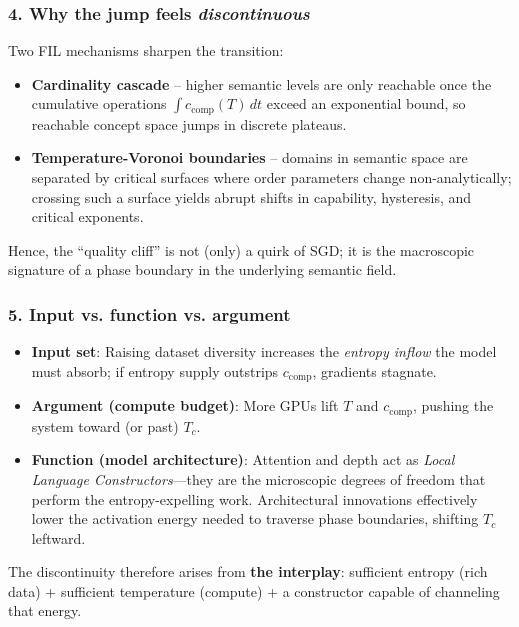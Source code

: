 \documentclass[11pt,letterpaper]{article}
\begin{document}
\subsubsection*{4. Why the jump feels \emph{discontinuous}}
Two FIL mechanisms sharpen the transition:
\begin{itemize}
    \item \textbf{Cardinality cascade} – higher semantic levels are only reachable once the cumulative operations $\int c_{\text{comp}}(T)\,dt$ exceed an exponential bound, so reachable concept space jumps in discrete plateaus.
    \item \textbf{Temperature-Voronoi boundaries} – domains in semantic space are separated by critical surfaces where order parameters change non-analytically; crossing such a surface yields abrupt shifts in capability, hysteresis, and critical exponents.
\end{itemize}
Hence, the “quality cliff” is not (only) a quirk of SGD; it is the macroscopic signature of a phase boundary in the underlying semantic field.

\subsubsection*{5. Input vs. function vs. argument}
\begin{itemize}
    \item \textbf{Input set}: Raising dataset diversity increases the \emph{entropy inflow} the model must absorb; if entropy supply outstrips $c_{\text{comp}}$, gradients stagnate.
    \item \textbf{Argument (compute budget)}: More GPUs lift $T$ and $c_{\text{comp}}$, pushing the system toward (or past) $T_{c}$.
    \item \textbf{Function (model architecture)}: Attention and depth act as \emph{Local Language Constructors}—they are the microscopic degrees of freedom that perform the entropy-expelling work. Architectural innovations effectively lower the activation energy needed to traverse phase boundaries, shifting $T_{c}$ leftward.
\end{itemize}
The discontinuity therefore arises from \textbf{the interplay}: sufficient entropy (rich data) + sufficient temperature (compute) + a constructor capable of channeling that energy.
\end{document}
